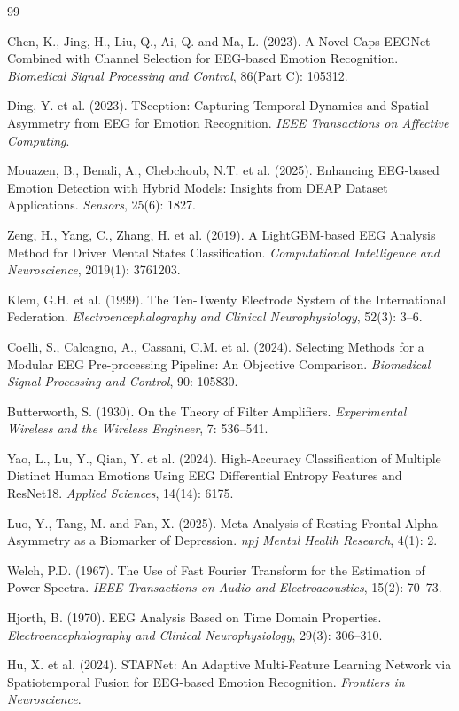 \documentclass[UTF8,zihao=-4,fontset=windows]{ctexart}
\numberwithin{equation}{section}
\numberwithin{figure}{section}
\numberwithin{table}{section}
\begin{document}
{}
\begin{thebibliography}{99}

Chen, K., Jing, H., Liu, Q., Ai, Q. and Ma, L. (2023). A Novel Caps-EEGNet Combined with Channel Selection for EEG-based Emotion Recognition. \textit{Biomedical Signal Processing and Control}, 86(Part C): 105312.

Ding, Y. et al. (2023). TSception: Capturing Temporal Dynamics and Spatial Asymmetry from EEG for Emotion Recognition. \textit{IEEE Transactions on Affective Computing}.

Mouazen, B., Benali, A., Chebchoub, N.T. et al. (2025). Enhancing EEG-based Emotion Detection with Hybrid Models: Insights from DEAP Dataset Applications. \textit{Sensors}, 25(6): 1827.

Zeng, H., Yang, C., Zhang, H. et al. (2019). A LightGBM-based EEG Analysis Method for Driver Mental States Classification. \textit{Computational Intelligence and Neuroscience}, 2019(1): 3761203.

Klem, G.H. et al. (1999). The Ten-Twenty Electrode System of the International Federation. \textit{Electroencephalography and Clinical Neurophysiology}, 52(3): 3--6.

Coelli, S., Calcagno, A., Cassani, C.M. et al. (2024). Selecting Methods for a Modular EEG Pre-processing Pipeline: An Objective Comparison. \textit{Biomedical Signal Processing and Control}, 90: 105830.

Butterworth, S. (1930). On the Theory of Filter Amplifiers. \textit{Experimental Wireless and the Wireless Engineer}, 7: 536--541.

Yao, L., Lu, Y., Qian, Y. et al. (2024). High-Accuracy Classification of Multiple Distinct Human Emotions Using EEG Differential Entropy Features and ResNet18. \textit{Applied Sciences}, 14(14): 6175.

Luo, Y., Tang, M. and Fan, X. (2025). Meta Analysis of Resting Frontal Alpha Asymmetry as a Biomarker of Depression. \textit{npj Mental Health Research}, 4(1): 2.

Welch, P.D. (1967). The Use of Fast Fourier Transform for the Estimation of Power Spectra. \textit{IEEE Transactions on Audio and Electroacoustics}, 15(2): 70--73.

Hjorth, B. (1970). EEG Analysis Based on Time Domain Properties. \textit{Electroencephalography and Clinical Neurophysiology}, 29(3): 306--310.

Hu, X. et al. (2024). STAFNet: An Adaptive Multi-Feature Learning Network via Spatiotemporal Fusion for EEG-based Emotion Recognition. \textit{Frontiers in Neuroscience}.

\end{thebibliography}
\end{document}
